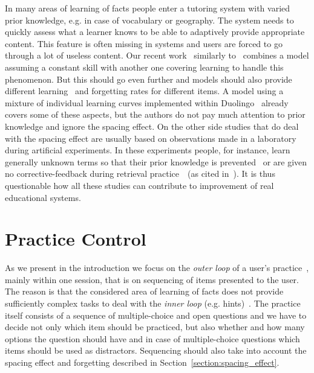 \documentclass[table,color,cover,twoside,nolot,nolof]{fithesis3/fithesis3}
\begin{document}
\noindent
In many areas of learning of facts people enter a tutoring system
with varied prior knowledge, e.g. in case of vocabulary or geography. The
system needs to quickly assess what a learner knows to be able to adaptively
provide appropriate content. This feature is often missing in systems
and users are forced to go through a lot of useless content. Our recent
work~\cite{papousek2014adaptive} similarly to~\cite{khajah2014integrating}
combines a model assuming a constant skill with another one covering learning
to handle this phenomenon. But this should go even further and models should
also provide different learning~\cite{pelanek2015modeling} and forgetting rates
for different items. A model using a mixture of individual learning curves
implemented within Duolingo~\cite{streeter2015mixture} already covers some of
these aspects, but the authors do not pay much attention to prior knowledge and
ignore the spacing effect. On the other side studies that do deal with the
spacing effect are usually based on observations made in a laboratory during
artificial experiments. In these experiments people, for instance, learn
generally unknown terms so that their prior knowledge is
prevented~\cite{kang2014retrieval} or are given no corrective-feedback
during retrieval practice~\cite{landauer1978optimum}~(as cited
in~\cite{kang2014retrieval}). It is thus questionable how all these studies can
contribute to improvement of real educational systems.

\section{Practice Control}
\label{section:practice_control}

As we present in the introduction we focus on the \emph{outer loop}
of a user's practice~\cite{vanlehn2006behavior}, mainly within one session, that
is on sequencing of items presented to the user. The reason is that the
considered area of learning of facts does not provide sufficiently complex
tasks to deal with the \emph{inner loop} (e.g.
hints)~\cite{vanlehn2006behavior}. The practice itself consists of a sequence
of multiple-choice and open questions and we have to decide not only which item
should be practiced, but also whether and how many options the question should
have and in case of multiple-choice questions which items should be used as
distractors. Sequencing should also take into account the spacing effect and
forgetting described in Section~\ref{section:spacing_effect}.
\end{document}
